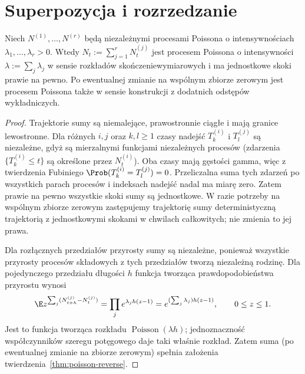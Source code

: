 \section{Superpozycja i rozrzedzanie}
\begin{twierdzenie}[Superpozycja]
Niech $N^{(1)},\ldots,N^{(r)}$ będą niezależnymi procesami
Poissona o intensywnościach $\lambda_1,\ldots,\lambda_r>0$.
Wtedy $N_t:=\sum_{j=1}^rN_t^{(j)}$ jest procesem Poissona
o intensywności $\lambda:=\sum_j\lambda_j$ w sensie
rozkładów skończeniewymiarowych i ma jednostkowe skoki
prawie na pewno. Po ewentualnej zmianie na wspólnym
zbiorze zerowym jest procesem Poissona także w sensie
konstrukcji z dodatnich odstępów wykładniczych.
\end{twierdzenie}
\begin{proof}
Trajektorie sumy są niemalejące, prawostronnie ciągłe
i mają granice lewostronne. Dla różnych $i,j$ oraz
$k,l\ge1$ czasy nadejść $T_k^{(i)}$ i $T_l^{(j)}$
są niezależne, gdyż są mierzalnymi funkcjami niezależnych
procesów (zdarzenia $\{T_k^{(i)}\le t\}$ są określone
przez $N_t^{(i)}$). Oba czasy mają gęstości gamma,
więc z twierdzenia Fubiniego
$\Prob(T_k^{(i)}=T_l^{(j)})=0$.
Przeliczalna suma tych zdarzeń po wszystkich parach
procesów i indeksach nadejść nadal ma miarę zero.
Zatem prawie na pewno wszystkie skoki sumy są jednostkowe.
W razie potrzeby na wspólnym zbiorze zerowym zastępujemy
trajektorię sumy deterministyczną trajektorią z jednostkowymi
skokami w chwilach całkowitych; nie zmienia to jej prawa.

Dla rozłącznych przedziałów przyrosty sumy są niezależne,
ponieważ wszystkie przyrosty procesów składowych z tych
przedziałów tworzą niezależną rodzinę. Dla pojedynczego
przedziału długości $h$ funkcja tworząca prawdopodobieństwa
przyrostu wynosi
\[
\E z^{\sum_j (N_{t+h}^{(j)}-N_t^{(j)})}
=\prod_j e^{\lambda_j h(z-1)}
=e^{(\sum_j\lambda_j)h(z-1)},\qquad 0\le z\le1.
\]
Jest to funkcja tworząca rozkładu
$\operatorname{Poisson}(\lambda h)$; jednoznaczność
współczynników szeregu potęgowego daje taki właśnie rozkład.
Zatem suma (po ewentualnej zmianie na zbiorze zerowym)
spełnia założenia twierdzenia~\ref{thm:poisson-reverse}.
\end{proof}

